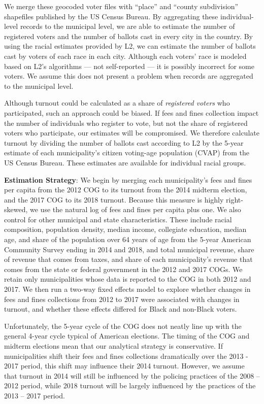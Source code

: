 \documentclass[
  12pt,
]{article}
\begin{document}
We merge these geocoded voter files with ``place'' and ``county subdivision'' shapefiles published by the US Census Bureau. By aggregating these individual-level records to the municipal level, we are able to estimate the number of registered voters and the number of ballots cast in every city in the country. By using the racial estimates provided by L2, we can estimate the number of ballots cast by voters of each race in each city. Although each voters' race is modeled based on L2's algorithms --- not self-reported --- it is possibly incorrect for some voters. We assume this does not present a problem when records are aggregated to the municipal level.

Although turnout could be calculated as a share of \emph{registered voters} who participated, such an approach could be biased. If fees and fines collection impact the number of individuals who register to vote, but not the share of registered voters who participate, our estimates will be compromised. We therefore calculate turnout by dividing the number of ballots cast according to L2 by the 5-year estimate of each municipality's citizen voting-age population (CVAP) from the US Census Bureau. These estimates are available for individual racial groups.

\textbf{Estimation Strategy}: We begin by merging each municipality's fees and fines per capita from the 2012 COG to its turnout from the 2014 midterm election, and the 2017 COG to its 2018 turnout. Because this measure is highly right-skewed, we use the natural log of fees and fines per capita plus one. We also control for other municipal and state characteristics. These include racial composition, population density, median income, collegiate education, median age, and share of the population over 64 years of age from the 5-year American Community Survey ending in 2014 and 2018, and total municipal revenue, share of revenue that comes from taxes, and share of each municipality's revenue that comes from the state or federal government in the 2012 and 2017 COGs. We retain only municipalities whose data is reported to the COG in both 2012 and 2017. We then run a two-way fixed effects model to explore whether changes in fees and fines collections from 2012 to 2017 were associated with changes in turnout, and whether these effects differed for Black and non-Black voters.

Unfortunately, the 5-year cycle of the COG does not neatly line up with the general 4-year cycle typical of American elections. The timing of the COG and midterm elections mean that our analytical strategy is conservative. If municipalities shift their fees and fines collections dramatically over the 2013 - 2017 period, this shift may influence their 2014 turnout. However, we assume that turnout in 2014 will still be influenced by the policing practices of the 2008 -- 2012 period, while 2018 turnout will be largely influenced by the practices of the 2013 -- 2017 period.
\end{document}

